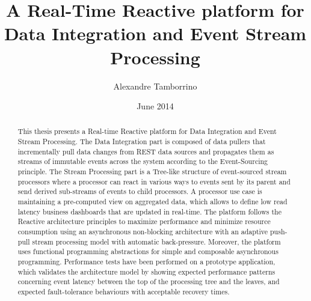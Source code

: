 \documentclass[a4paper,11pt]{kth-mag}
\title{A Real-Time Reactive platform for Data Integration and Event Stream Processing}
\author{Alexandre Tamborrino}
\date{June 2014}
\begin{document}
\frontmatter
\pagestyle{empty}
\removepagenumbers
\maketitle
{}

\begin{abstract}
This thesis presents a Real-time Reactive platform for Data Integration and Event Stream Processing. The Data Integration part is composed of data pullers that incrementally pull data changes from REST data sources and propagates them as streams of immutable events across the system according to the Event-Sourcing principle. The Stream Processing part is a Tree-like structure of event-sourced stream processors where a processor can react in various ways to events sent by its parent and send derived sub-streams of events to child processors. A processor use case is maintaining a pre-computed view on aggregated data, which allows to define low read latency business dashboards that are updated in real-time.
The platform follows the Reactive architecture principles to maximize performance and minimize resource consumption using an asynchronous non-blocking architecture with an adaptive push-pull stream processing model with automatic back-pressure. Moreover, the platform uses functional programming abstractions for simple and composable asynchronous programming.
Performance tests have been performed on a prototype application, which validates the architecture model by showing expected performance patterns concerning event latency between the top of the processing tree and the leaves, and expected fault-tolerance behaviours with acceptable recovery times.
\end{abstract}
\clearpage



\renewcommand{\listoflistings}{%
  \cleardoublepage
  \addcontentsline{toc}{chapter}{\listoflistingscaption}%
  \listof{listing}{\listoflistingscaption}%
}

\begingroup
\let\clearpage\relax
\let\cleardoublepage\relax
\let\newpage\relax
\tableofcontents*
\listoffigures
\listoflistings
\endgroup

\mainmatter
\pagestyle{newchap}










\newpage
\printbibliography
\end{document}

